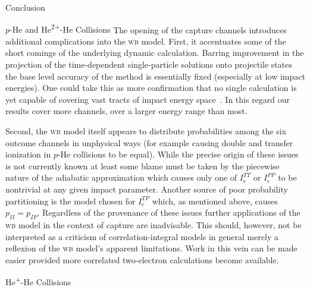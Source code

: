 \documentclass[letterpaper, 10 pt]{report}
\begin{document}
\begin{chapter}{Conclusion \label{chap:con}}
\begin{section}{\texorpdfstring{$p$}{p}-He and \texorpdfstring{He\textsuperscript{2+}}{He2+}-He
                   Collisions \label{sec:con-phe2p-he}}
      The opening of the capture channels introduces additional complications into the \textsc{wb}
      model. First, it accentuates some of the short comings of the underlying dynamic calculation.
      Barring improvement in the projection of the time-dependent single-particle solutions onto
      projectile states the base level accuracy of the method is essentially fixed (especially at low
      impact energies). One could take this as more confirmation that no single calculation is yet
      capable of covering vast tracts of impact energy space~\cite{LRV-14}. In this regard our results
      cover more channels, over a larger energy range than most.
 
      Second, the \textsc{wb} model itself appears to distribute probabilities among the six outcome
      channels in unphysical ways (for example causing double and transfer ionization in $p$-He
      collisions to be equal). While the precise origin of these issues is not currently known at least
      some blame must be taken by the piecewise nature of the adiabatic approximation which causes only
      one of $I^{TT}_\mathrm{c}$ or $I^{PP}_\mathrm{c}$ to be nontrivial at any given impact parameter.
      Another source of poor probability partitioning is the model chosen for $I^{TP}_\mathrm{c}$ which,
      as mentioned above, causes $p_{II} = p_{IP}$. Regardless of the provenance of these issues further
      applications of the \textsc{wb} model in the context of capture are inadvisable. This should,
      however, not be interpreted as a criticism of correlation-integral models in general merely a
      reflexion of the \textsc{wb} model's apparent limitations. Work in this vein can be made easier
      provided more correlated two-electron calculations become available.

   \end{section}

   \begin{section}{\texorpdfstring{He\textsuperscript{+}}{He+}-He Collisions \label{sec:con-hephe}}

   \end{section}

\end{chapter}

\cleardoublepage
{}
{}

\singlespacing
\linespread{1.05}

\printbibliography[title=References] %
\end{document}
